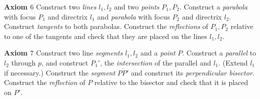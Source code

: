 \textbf{Axiom $6$} Construct two \emph{lines} $l_1,l_2$ and two \emph{points} $P_1,P_2$. Construct a \emph{parabola} with focus $P_1$ and directrix $l_1$ and \emph{parabola} with focus $P_2$ and directrix $l_2$. Construct \emph{tangents} to both parabolas. Construct the \emph{reflections} of $P_1,P_2$ relative to one of the tangents and check that they are placed on the lines $l_1,l_2$.

\textbf{Axiom $7$} Construct two line \emph{segments} $l_1,l_2$ and a \emph{point} $P$. Construct a \emph{parallel} to $l_2$ through $p$, and construct $P_1'$, the \emph{intersection} of the parallel and $l_1$. (Extend $l_1$ if necessary.) Construct the  \emph{segment} $\overline{PP'}$ and construct its \emph{perpendicular bisector}. Construct the \emph{reflection} of $P$ relative to the bisector and check that it is placed on $P'$.
